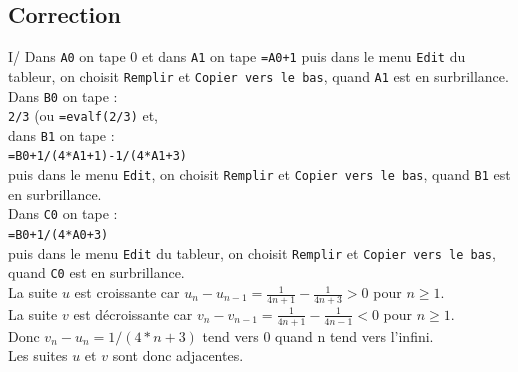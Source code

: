 \documentclass[a4paper,11pt]{book}
\begin{document}
\subsection{Correction}

I/ Dans {\tt A0} on tape 0 et dans {\tt A1} on tape {\tt =A0+1} puis dans
le menu {\tt Edit} du tableur, on choisit {\tt Remplir}  et 
{\tt Copier vers le bas}, quand {\tt A1} est en surbrillance.\\
 Dans {\tt B0} on tape :\\
{\tt 2/3} (ou {\tt =evalf(2/3)} et,\\
 dans {\tt B1} on tape :\\
{\tt =B0+1/(4*A1+1)-1/(4*A1+3)}\\ puis dans le menu {\tt Edit}, on choisit 
{\tt Remplir}  et {\tt Copier vers le bas}, quand {\tt B1} est en 
surbrillance.\\
Dans {\tt C0} on tape :\\
{\tt =B0+1/(4*A0+3)} \\
puis dans le menu {\tt Edit} du tableur, on choisit {\tt Remplir}  et 
{\tt Copier vers le bas}, quand {\tt C0} est en surbrillance.\\
La suite $u$ est croissante car $u_{n}-u_{n-1}=\frac{1}{4n+1}-\frac{1}{4n+3}>0$ pour $n \geq 1$.\\
La suite $v$ est d\'ecroissante car $v_{n}-v_{n-1}=\frac{1}{4n+1}-\frac{1}{4n-1}<0$ pour $n \geq 1$.\\
Donc  $v_n-u_n=1/(4*n+3)$ tend vers 0 quand n tend vers l'infini.\\
Les suites $u$ et $v$ sont donc adjacentes.
\end{document}
